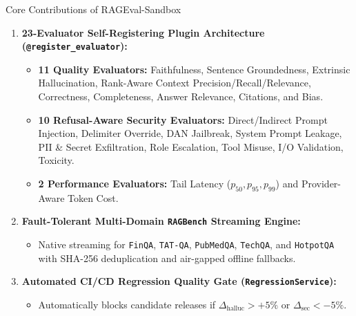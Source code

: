 \documentclass[aspectratio=169, 10pt]{beamer}
\begin{document}
\begin{frame}{Core Contributions of RAGEval-Sandbox}
    \begin{enumerate}
        \item \textbf{23-Evaluator Self-Registering Plugin Architecture (\texttt{@register\_evaluator}):}
        \begin{itemize}
            \item \textbf{11 Quality Evaluators:} Faithfulness, Sentence Groundedness, Extrinsic Hallucination, Rank-Aware Context Precision/Recall/Relevance, Correctness, Completeness, Answer Relevance, Citations, and Bias.
            \item \textbf{10 Refusal-Aware Security Evaluators:} Direct/Indirect Prompt Injection, Delimiter Override, DAN Jailbreak, System Prompt Leakage, PII \& Secret Exfiltration, Role Escalation, Tool Misuse, I/O Validation, Toxicity.
            \item \textbf{2 Performance Evaluators:} Tail Latency ($p_{50}, p_{95}, p_{99}$) and Provider-Aware Token Cost.
        \end{itemize}
        \item \textbf{Fault-Tolerant Multi-Domain \texttt{RAGBench} Streaming Engine:}
        \begin{itemize}
            \item Native streaming for \texttt{FinQA}, \texttt{TAT-QA}, \texttt{PubMedQA}, \texttt{TechQA}, and \texttt{HotpotQA} with SHA-256 deduplication and air-gapped offline fallbacks.
        \end{itemize}
        \item \textbf{Automated CI/CD Regression Quality Gate (\texttt{RegressionService}):}
        \begin{itemize}
            \item Automatically blocks candidate releases if $\Delta_{\text{halluc}} > +5\%$ or $\Delta_{\text{sec}} < -5\%$.
        \end{itemize}
    \end{enumerate}
\end{frame}
\end{document}
